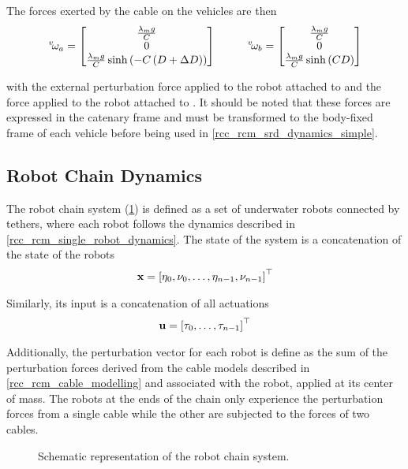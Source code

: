 The forces exerted by the cable on the vehicles are then
\begin{align}
	\fldvect{\omega}{v}{a} = \begin{bmatrix} \frac{\ldscal{\lambda}{m}\scal{g}}{\catC{}}\\ 0 \\ \frac{\ldscal{\lambda}{m}\scal{g}}{\catC{}}\sinh{\left(-\catC\left(\catD+\catdD\right)\right)} \end{bmatrix} \hspace{1cm}
	\fldvect{\omega}{v}{b} = \begin{bmatrix} \frac{\ldscal{\lambda}{m}\scal{g}}{\catC{}}\\ 0 \\ \frac{\ldscal{\lambda}{m}\scal{g}}{\catC{}}\sinh{\left(\catC\catD\right)} \end{bmatrix}
\end{align}

with  the external perturbation force applied to the robot attached to
 and  the force applied to the robot attached to . It
should be noted that these forces are expressed in the catenary frame  and must be
transformed to the body-fixed frame  of each vehicle before being used in
\cref{rcc_rcm_srd_dynamics_simple}.

\subsection{Robot Chain Dynamics}
\label{rcc_rcm_robot_chain_dynamics}

The robot chain system (\cref{rcc_rcm_rcd_schematic}) is defined as a set of  underwater
robots connected by tethers, where each robot follows the dynamics described in
\cref{rcc_rcm_single_robot_dynamics}. The state of the system is a concatenation of the state of
the robots
\begin{align}
	\vect{x} = \left[\ldvect{\eta}{0}, \ldvect{\nu}{0}, \dots, \ldvect{\eta}{n-1}, \ldvect{\nu}{n-1}\right]^{\top}
	\label{rcc_rcm_rcd_state_vector}
\end{align}

Similarly, its input is a concatenation of all actuations
\begin{align}
	\vect{u} = \left[\ldvect{\tau}{0}, \dots, \ldvect{\tau}{n-1}\right]^{\top}
	\label{rcc_rcm_rcd_actuation_vector}
\end{align}

Additionally, the perturbation vector for each robot is define as the sum of the perturbation
forces derived from the cable models described in \cref{rcc_rcm_cable_modelling} and associated
with the robot, applied at its center of mass. The robots at the ends of the chain only experience
the perturbation forces from a single cable while the other are subjected to the forces of two
cables.
\begin{figure}
	\centering
	\caption{Schematic representation of the robot chain system.}
	\label{rcc_rcm_rcd_schematic}
\end{figure}

